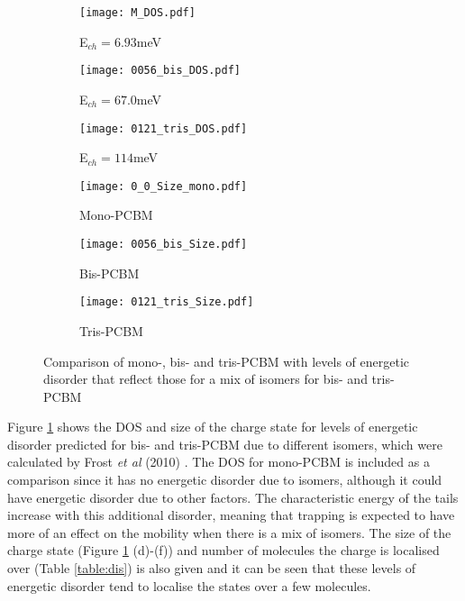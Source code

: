 \documentclass[a4paper,12pt]{article}
\begin{document}
\begin{figure}[H]
\begin{subfigure}[b]{0.3\textwidth}
\texttt{[image: M\_DOS.pdf]}
\caption{E$_{ch}=6.93$meV}
\end{subfigure}
\begin{subfigure}[b]{0.3\textwidth}
\texttt{[image: 0056\_bis\_DOS.pdf]}
\caption{E$_{ch}=67.0$meV}
\end{subfigure}
\begin{subfigure}[b]{0.3\textwidth}
\texttt{[image: 0121\_tris\_DOS.pdf]}
\caption{E$_{ch}=114$meV}
\end{subfigure}
\begin{subfigure}[b]{0.32\textwidth}
\texttt{[image: 0\_0\_Size\_mono.pdf]}
\caption{Mono-PCBM}
\end{subfigure}
\begin{subfigure}[b]{0.32\textwidth}
\texttt{[image: 0056\_bis\_Size.pdf]}
\caption{Bis-PCBM}
\end{subfigure}
\begin{subfigure}[b]{0.32\textwidth}
\texttt{[image: 0121\_tris\_Size.pdf]}
\caption{Tris-PCBM}
\end{subfigure}
\caption{Comparison of mono-, bis- and tris-PCBM with levels of energetic disorder that reflect those for a mix of isomers for bis- and tris- PCBM}
\label{fig:alldis}
\end{figure}

\noindent Figure \ref{fig:alldis} shows the DOS and size of the charge state for levels of energetic disorder predicted for bis- and tris-PCBM due to different isomers, which were calculated by Frost \textit{et al} (2010) \cite{Frost2010}. The DOS for mono-PCBM is included as a comparison since it has no energetic disorder due to isomers, although it could have energetic disorder due to other factors. The characteristic energy of the tails increase with this additional disorder, meaning that trapping is expected to have more of an effect on the mobility when there is a mix of isomers. The size of the charge state (Figure \ref{fig:alldis} (d)-(f)) and number of molecules the charge is localised over (Table \ref{table:dis}) is also given and it can be seen that these levels of energetic disorder tend to localise the states over a few molecules.
\end{document}

